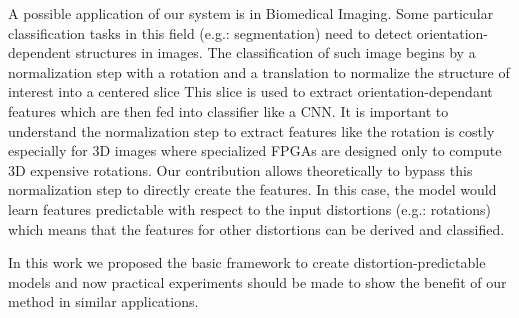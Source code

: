 \documentclass[a4paper,12pt]{report}
\newcommand{\eg}{e.g.}
\begin{document}

A possible application of our system is in Biomedical Imaging.
Some particular classification tasks in this field (\eg: segmentation) need to detect orientation-dependent structures in images.
The classification of such image begins by a normalization step with a rotation and a translation to normalize the structure of interest into a centered slice
This slice is used to extract orientation-dependant features which are then fed into classifier like a CNN.
It is important to understand the normalization step to extract features like the rotation is costly especially for 3D images where specialized FPGAs are designed only to compute 3D expensive rotations.
Our contribution allows theoretically to bypass this normalization step to directly create the features.
In this case, the model would learn features predictable with respect to the input distortions (\eg: rotations) which means that the features for other distortions can be derived and classified.

In this work we proposed the basic framework to create distortion-predictable models and now practical experiments should be made to show the benefit of our method in similar applications.



{}


\nocite{lecun2004learning}
\end{document}
